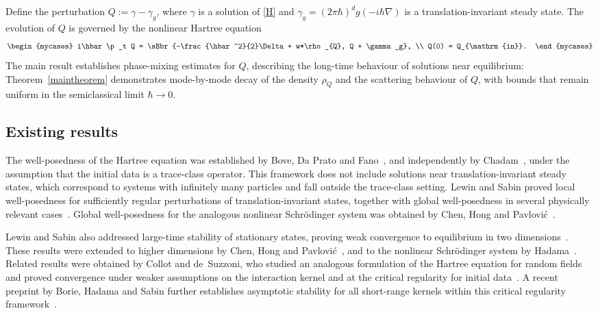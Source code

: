 Define the perturbation \(Q := \gamma - \gamma_g\), where \(\gamma\) is a solution of \eqref{H} and $\gamma_g=(2\pi\hbar)^dg(-i\hbar\nabla)$ is a translation-invariant steady state. The evolution of \(Q\) is governed by the nonlinear Hartree equation
\begin{align}\label{NH}
\begin{mycases}
i\hbar\p_t Q = \sBbr{-\frac{\hbar^2}{2}\Delta + w*\rho_{Q}, Q + \gamma_g}, \\
Q(0) = Q_{\mathrm{in}}.
\end{mycases}
\end{align}
The main result establishes phase-mixing estimates for \(Q\), describing the long-time behaviour of solutions near equilibrium: Theorem~\ref{maintheorem} demonstrates mode-by-mode decay of the density \(\rho_Q\) and the scattering behaviour of \(Q\), with bounds that remain uniform in the semiclassical limit $\hbar\to0$.

\subsection{Existing results}
The well-posedness of the Hartree equation was established by Bove, Da Prato and Fano~\cite{BoveDaPratoFano1974,BoveDaPratoFano1976}, and independently by Chadam~\cite{Chadam1976}, under the assumption that the initial data is a trace-class operator. This framework does not include solutions near translation-invariant steady states, which correspond to systems with infinitely many particles and fall outside the trace-class setting. Lewin and Sabin proved local well-posedness for sufficiently regular perturbations of translation-invariant states, together with global well-posedness in several physically relevant cases~\cite{LewinSabinI2015}. Global well-posedness for the analogous nonlinear Schrödinger system was obtained by Chen, Hong and Pavlović~\cite{ChenHongPavlovic2017}.

Lewin and Sabin also addressed large-time stability of stationary states, proving weak convergence to equilibrium in two dimensions~\cite{LewinSabinII2014}. These results were extended to higher dimensions by Chen, Hong and Pavlović~\cite{ChenHongPavlovic2018}, and to the nonlinear Schrödinger system by Hadama~\cite{hadama2024asymptoticstabilitywideclass}. Related results were obtained by Collot and de~Suzzoni, who studied an analogous formulation of the Hartree equation for random fields and proved convergence under weaker assumptions on the interaction kernel and at the critical regularity for initial data~\cite{CollotdeSuzzoni2020,CollotdeSuzzoni2022}. A recent preprint by Borie, Hadama and Sabin further establishes asymptotic stability for all short-range kernels within this critical regularity framework~\cite{BorieHadamaSabin2025}.


